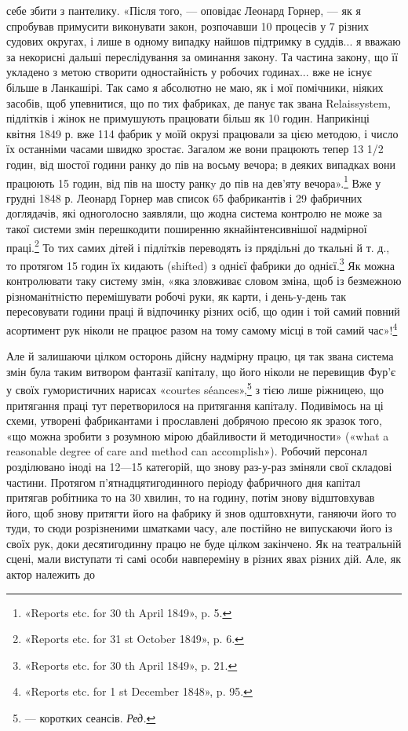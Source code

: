 \parcont{}  %
себе збити з пантелику. «Після того, — оповідає Леонард Горнер, —
як я спробував примусити виконувати закон, розпочавши 10 процесів
у 7 різних судових округах, і лише в одному випадку найшов
підтримку в суддів... я вважаю за некорисні дальші переслідування
за оминання закону. Та частина закону, що її укладено
з метою створити одностайність у робочих годинах... вже не існує
більше в Ланкашірі. Так само я абсолютно не маю, як і мої помічники,
ніяких засобів, щоб упевнитися, що по тих фабриках, де
панує так звана Relaissystem, підлітків і жінок не примушують
працювати більш як 10 годин. Наприкінці квітня 1849 р. вже
114 фабрик у моїй окрузі працювали за цією методою, і число
їх останніми часами швидко зростає. Загалом же вони працюють
тепер 13 1/2 годин, від шостої години ранку до пів на восьму вечора;
в деяких випадках вони працюють 15 годин, від пів на шосту
ранкy до пів на дев’яту вечора».\footnote{
«Reports etc. for 30 th April 1849», p. 5.
} Вже у грудні 1848 р. Леонард
Горнер мав список 65 фабрикантів і 29 фабричних доглядачів,
які одноголосно заявляли, що жодна система контролю не може
за такої системи змін перешкодити поширенню якнайінтенсивнішої
надмірної праці.\footnote{
«Reports etc. for 31 st October 1849», p. 6.
} То тих самих дітей і підлітків переводять
із прядільні до ткальні й т. д., то протягом 15 годин їх
кидають (shifted) з однієї фабрики до однієї.\footnote{
«Reports etc. for 30 th April 1849», p. 21.
} Як можна контролювати
таку систему змін, «яка зловживає словом зміна, щоб із
безмежною різноманітністю перемішувати робочі руки, як карти,
і день-у-день так пересовувати години праці й відпочинку
різних осіб, що один і той самий повний асортимент рук ніколи
не працює разом на тому самому місці в той самий час»!\footnote{
«Reports etc. for 1 st December 1848», p. 95.
}

Але й залишаючи цілком осторонь дійсну надмірну працю,
ця так звана система змін була таким витвором фантазії капіталу,
що його ніколи не перевищив Фур’є у своїх гумористичних
нарисах «courtes séances»,\footnote*{
— коротких сеансів. \emph{Ред.}
} з тією лише ріжницею, що притягання
праці тут перетворилося на притягання капіталу. Подивімось
на ці схеми, утворені фабрикантами і прославлені добрячою
пресою як зразок того, «що можна зробити з розумною мірою
дбайливости й методичности» («what a reasonable degree of care
and method can accomplish»). Робочий персонал розділювано
іноді на 12—15 категорій, що знову раз-у-раз зміняли свої
складові частини. Протягом п’ятнадцятигодинного періоду фабричного
дня капітал притягав робітника то на 30 хвилин, то на
годину, потім знову відштовхував його, щоб знову притягти
його на фабрику й знов одштовхнути, ганяючи його то туди, то сюди
розрізненими шматками часу, але постійно не випускаючи його
із своїх рук, доки десятигодинну працю не буде цілком закінчено.
Як на театральній сцені, мали виступати ті самі особи навпереміну
в різних явах різних дій. Але, як актор належить до
\parbreak{}  %
